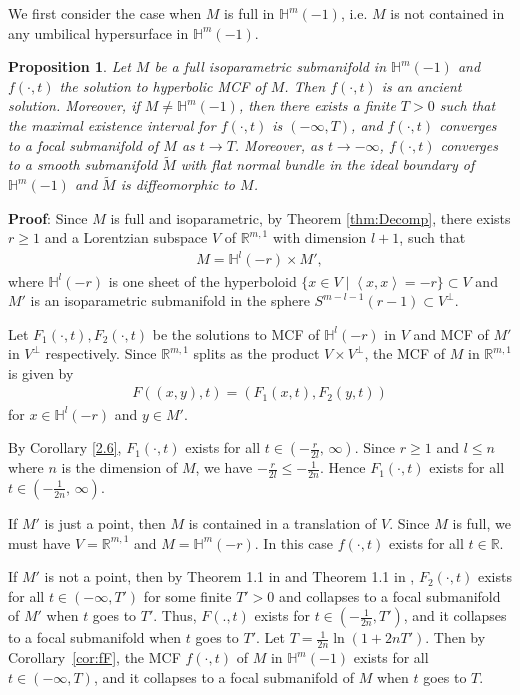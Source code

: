 \documentclass[12pt]{article}
\newtheorem{prop}[lem]{Proposition}
\begin{document}
We first consider the case when $M$ is full in $ \mathbb{H}^{m}(-1)$, i.e. $M$ is not contained in any umbilical hypersurface
in $\mathbb{H}^{m}(-1)$.
\begin{prop} \label{1.9}
		Let  $M$ be a full isoparametric submanifold in $\mathbb{H}^{m}(-1)$
and $f(\cdot,t)$ the solution to hyperbolic MCF of $M$.
  Then  $f(\cdot,t)$ is an ancient solution.
  Moreover, if $M \neq \mathbb{H}^{m}(-1)$,
   then there exists a finite $T > 0$ such that the maximal existence interval for $f(\cdot,t)$ is $(-\infty, T)$, and $f(\cdot,t)$ converges to a focal submanifold  of $M$ as $t\rightarrow T$.
   Moreover, as $t\rightarrow -\infty$, $f(\cdot,t)$ converges to a smooth submanifold $\widetilde M$ with flat normal bundle in the ideal boundary of $\mathbb{H}^{m}(-1)$ and $\widetilde M$ is diffeomorphic to $M$.
\end{prop}
\noindent
{\bf Proof}:
		Since $M$ is full and isoparametric, by Theorem \ref{thm:Decomp}, there exists $r \geq 1$ and a Lorentzian subspace $V$ of $\mathbb R^{m,1}$ with dimension $l+1$, such that
\begin{align*}
			M=\mathbb{H}^l(-r) \times M',
\end{align*}
where $\mathbb{H}^l(-r)$ is one sheet of the hyperboloid
$\{x \in V \mid \left<x, x\right>=-r\} \subset V$ and
$M'$ is an isoparametric submanifold in the sphere $S^{m-l-1}(r-1)\subset V^{\perp} $.
		
Let $F_1(\cdot,t),F_2(\cdot,t)$ be the solutions to MCF of $\mathbb{H}^l(-r)$ in $V$ and MCF of $M'$ in  $V^{\perp}$ respectively.  Since $\mathbb{R}^{m,1}$ splits as the product $V \times V^\perp$, the MCF of $M$ in $\mathbb{R}^{m,1}$
is given by
		\begin{align}
			F((x,y),t)=(F_1(x,t),F_2(y,t)) \label{7.1.6}
		\end{align}
for $x \in \mathbb{H}^l(-r)$ and $y \in M'$.
		 		
		
By Corollary \ref{2.6}, $F_1(\cdot,t)$ exists for all
$t\in (-\frac{r}{2l}, \, \infty)$. Since $r \geq 1$ and $l \leq n$ where $n$ is the dimension of $M$,
we have  $-\frac{r}{2l} \leq -\frac{1}{2n}$. Hence $F_1(\cdot,t)$ exists for all $t\in (-\frac{1}{2n}, \, \infty)$.

If $M'$ is just a point, then $M$ is contained in a translation of $V$.
Since $M$ is full, we must have $V=\mathbb{R}^{m,1}$ and $M=\mathbb{H}^m(-r)$.
In this case $f(\cdot, t)$ exists for all $t \in \mathbb{R}$.

If $M'$ is not a point, then by Theorem 1.1 in \cite{X.CT} and Theorem 1.1 in \cite{X.C},  $F_2(\cdot,t)$ exists  for all $t\in (-\infty, T')$ for some finite $T' > 0$ and collapses to a focal submanifold of $M'$ when $t$ goes to $T'$.
Thus, $F(.,t)$ exists for $t\in (-\frac{1}{2n},T')$, and it collapses to a focal submanifold  when $t$ goes to $T'$. Let $T = \frac{1}{2n} \ln(1+2n T')$. Then
by Corollary~\ref{cor:fF}, the MCF $f(\cdot, t)$ of $M$ in $\mathbb{H}^{m}(-1)$ exists for
all $t \in (-\infty, T)$, and it collapses to a focal submanifold of $M$ when $t$ goes to $T$.
\end{document}
